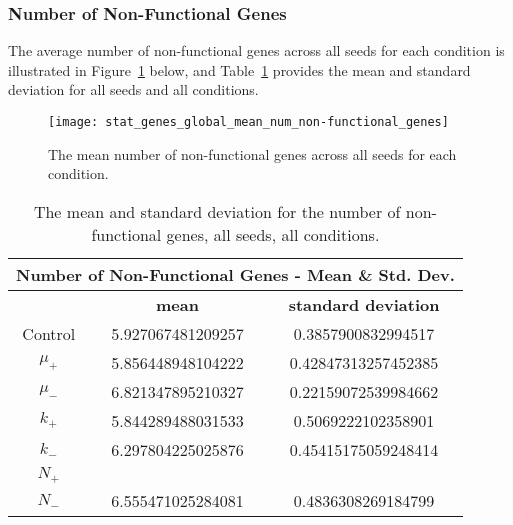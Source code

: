 \subsubsection{Number of Non-Functional Genes}
The average number of non-functional genes across all seeds for each condition is illustrated in Figure~\ref{fig:mean_num_non-functional_genes} below, and Table~\ref{table:non-functional_genes_mean_std_dev} provides the mean and standard deviation for all seeds and all conditions.  

\begin{figure}[H]
	\centering
	\texttt{[image: stat\_genes\_global\_mean\_num\_non-functional\_genes]}
	\caption[Mean number of non-functional genes]{The mean number of non-functional genes across all seeds for each condition.}
	\label{fig:mean_num_non-functional_genes}
\end{figure}


\begin{table}[h]
	\centering
	\begin{tabular}{|c|c|c|}
		\hline
		\multicolumn{3}{c}{\Large \textbf{Number of Non-Functional Genes - Mean \& Std. Dev.}} \\
		\hline
		& \textbf{mean} & \textbf{standard deviation} \\
		\hline
		Control & 5.927067481209257 & 0.3857900832994517 \\
		\hline
		$\mu_+$ & 5.856448948104222	& 0.42847313257452385 \\
		\hline
		$\mu_-$ & 6.821347895210327 & 0.22159072539984662 \\
		\hline
		$k_+$ & 5.844289488031533 & 0.5069222102358901 \\
		\hline
		$k_-$ & 6.297804225025876 & 0.45415175059248414 \\
		\hline
		$N_+$ & & \\
		\hline
		$N_-$ & 6.555471025284081 & 0.4836308269184799 \\
		\hline
	\end{tabular}
	\caption[Number of Non-functional Genes - Mean \& St. Dev.]{The mean and standard deviation for the number of non-functional genes, all seeds, all conditions.}
	\label{table:non-functional_genes_mean_std_dev}
\end{table}

